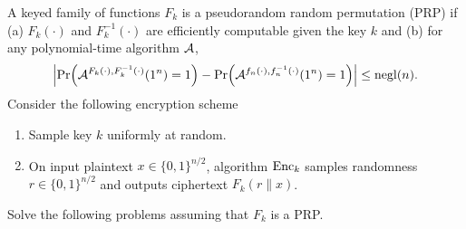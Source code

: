 \documentclass{homework}
\begin{document}
\begin{problem}
  A keyed family of functions $F_{k}$ is a pseudorandom random permutation (PRP)
  if (a) $F_{k}(\cdot)$ and $F^{-1}_{k}(\cdot)$ are efficiently computable given
  the key $k$ and (b) for any polynomial-time algorithm $\mathcal{A}$,
  \begin{equation*}
    \left\lvert \Pr \Bigl( \mathcal{A}^{F_{k}(\cdot), F^{-1}_{k}(\cdot)}(1^{n}) = 1 \Bigr) -
      \Pr \Bigl( \mathcal{A}^{f_{n}(\cdot), f^{-1}_{n}(\cdot)}(1^{n}) = 1 \Bigr) \right\rvert
    \le \mathrm{negl}(n).
  \end{equation*}
  Consider the following encryption scheme
  \begin{enumerate}
    \item Sample key $k$ uniformly at random.
    \item On input plaintext $x \in {\{0,1\}}^{n/2}$, algorithm $\mathrm{Enc}_{k}$
          samples randomness $r \in {\{0,1\}}^{n/2}$ and outputs ciphertext
          $F_{k}(r \| x)$.
  \end{enumerate}
  Solve the following problems assuming that $F_{k}$ is a PRP\@.

\end{problem}
\end{document}
